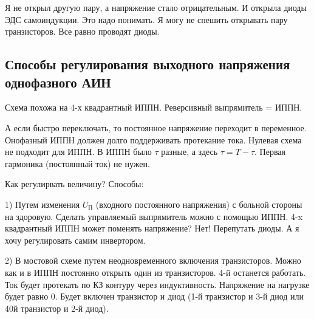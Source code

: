 Я не открыл другую пару, а напряжение стало отрицательным. И открыла диоды ЭДС самоиндукции. Это надо понимать. Я могу не спешить 
открывать пару транзисторов. Все равно проводят диоды.

\subsection*{Способы регулирования выходного напряжения однофазного АИН}
Схема похожа на 4-х квадрантный ИППН. Реверсивный выпрямитель = ИППН. 

А если быстро переключать, то постоянное напряжение переходит в переменное. Онофазный ИППН должен долго поддерживать протекание тока.
Нулевая схема не подходит для ИППН. В ИППН было $\tau$ разные, а здесь $\tau = T - \tau$. Первая гармоника (постоянный ток) не нужен.

Как регулирвать величину? Способы:

1) Путем изменения $U_\text{П}$ (входного постоянного напряжения) с больной стороны на здоровую. Сделать управляемый выпрямитель
можно с помощью ИППН.
4-x квадрантный ИППН может поменять напряжение? Нет! Перепутать диоды. А я хочу регулировать самим инвертором.

2) В мостовой схеме путем неодновременного включения транзисторов.
Можно как и в ИППН постоянно открыть один из транзисторов. 4-й останется работать. Ток будет протекать по КЗ контуру
через индуктивность. Напряжение на нагрузке будет равно 0. Будет включен транзистор и диод (1-й транзистор и 3-й диод
или 40й транзистор и 2-й диод).

